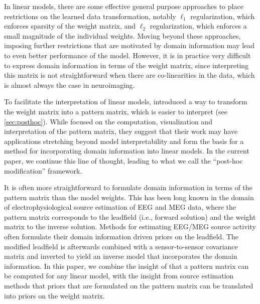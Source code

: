 \documentclass[a4paper]{vanvliet_paper}
\begin{document}
In linear models, there are some effective general purpose approaches to place restrictions on the learned data transformation, notably $\ell_1$ regularization\cite{Tibshirani1996}, which enforces sparsity of the weight matrix, and $\ell_2$ regularization\cite{Rifkin2007}, which enforces a small magnitude of the individual weights.
Moving beyond these approaches, imposing further restrictions that are motivated by domain information may lead to even better performance of the model.
However, it is in practice very difficult to express domain information in terms of the weight matrix\cite{Haufe2014}, since interpreting this matrix is not straightforward when there are co-linearities in the data, which is almost always the case in neuroimaging.

To facilitate the interpretation of linear models, \textcite{Haufe2014} introduced a way to transform the weight matrix into a pattern matrix, which is easier to interpret (see \autoref{sec:posthoc}).
While \textcite{Haufe2014} focused on the computation, visualization and interpretation of the pattern matrix, they suggest that their work may have applications stretching beyond model interpretability and form the basis for a method for incorporating domain information into linear models.
In the current paper, we continue this line of thought, leading to what we call the ``post-hoc modification'' framework.

It is often more straightforward to formulate domain information in terms of the pattern matrix than the model weights.
This has been long known in the domain of electrophysiological source estimation of \gls{EEG} and \gls{MEG} data, where the pattern matrix corresponds to the leadfield (i.e., forward solution) and the weight matrix to the inverse solution.
Methods for estimating \gls{EEG}/\gls{MEG} source activity often formulate their domain information driven priors on the leadfield\cite{Kohler1996, Lin2006a, Wipf2009, Trujillo-Barreto2008}.
The modified leadfield is afterwards combined with a sensor-to-sensor covariance matrix and inverted to yield an inverse model that incorporates the domain information.
In this paper, we combine the insight of \textcite{Haufe2014} that a pattern matrix can be computed for any linear model, with the insight from source estimation methods that priors that are formulated on the pattern matrix can be translated into priors on the weight matrix.
\end{document}
